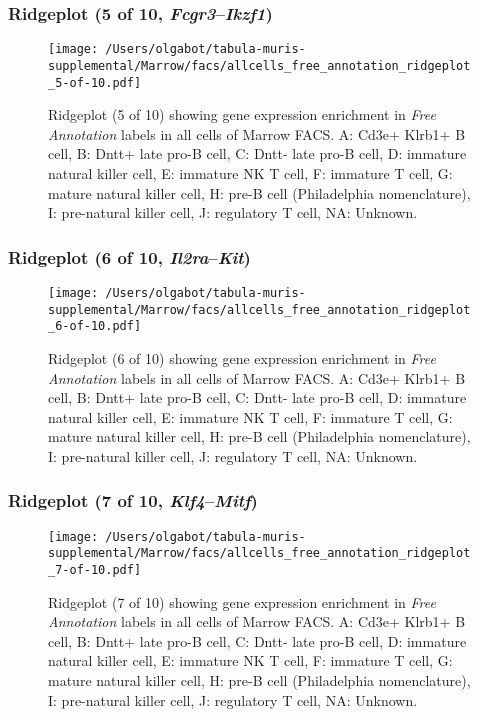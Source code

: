 \clearpage

\subsubsection{Ridgeplot (5 of 10, \emph{Fcgr3}--\emph{Ikzf1})}
\begin{figure}[h]
\centering
\texttt{[image: /Users/olgabot/tabula-muris-supplemental/Marrow/facs/allcells\_free\_annotation\_ridgeplot\_5-of-10.pdf]}

\caption{ Ridgeplot (5 of 10)  showing gene expression enrichment in \emph{Free Annotation} labels in all cells of Marrow FACS. A: Cd3e+ Klrb1+ B cell, B: Dntt+ late pro-B cell, C: Dntt- late pro-B cell, D: immature natural killer cell, E: immature NK T cell, F: immature T cell, G: mature natural killer cell, H: pre-B cell (Philadelphia nomenclature), I: pre-natural killer cell, J: regulatory T cell, NA: Unknown.}
\end{figure}


\clearpage

\subsubsection{Ridgeplot (6 of 10, \emph{Il2ra}--\emph{Kit})}
\begin{figure}[h]
\centering
\texttt{[image: /Users/olgabot/tabula-muris-supplemental/Marrow/facs/allcells\_free\_annotation\_ridgeplot\_6-of-10.pdf]}

\caption{ Ridgeplot (6 of 10)  showing gene expression enrichment in \emph{Free Annotation} labels in all cells of Marrow FACS. A: Cd3e+ Klrb1+ B cell, B: Dntt+ late pro-B cell, C: Dntt- late pro-B cell, D: immature natural killer cell, E: immature NK T cell, F: immature T cell, G: mature natural killer cell, H: pre-B cell (Philadelphia nomenclature), I: pre-natural killer cell, J: regulatory T cell, NA: Unknown.}
\end{figure}


\clearpage

\subsubsection{Ridgeplot (7 of 10, \emph{Klf4}--\emph{Mitf})}
\begin{figure}[h]
\centering
\texttt{[image: /Users/olgabot/tabula-muris-supplemental/Marrow/facs/allcells\_free\_annotation\_ridgeplot\_7-of-10.pdf]}

\caption{ Ridgeplot (7 of 10)  showing gene expression enrichment in \emph{Free Annotation} labels in all cells of Marrow FACS. A: Cd3e+ Klrb1+ B cell, B: Dntt+ late pro-B cell, C: Dntt- late pro-B cell, D: immature natural killer cell, E: immature NK T cell, F: immature T cell, G: mature natural killer cell, H: pre-B cell (Philadelphia nomenclature), I: pre-natural killer cell, J: regulatory T cell, NA: Unknown.}
\end{figure}


